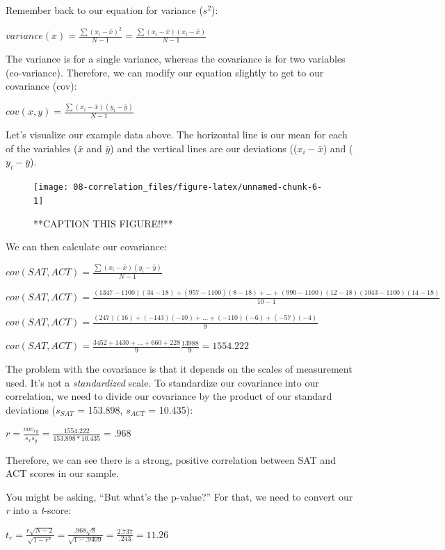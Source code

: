 \documentclass[
]{book}
\begin{document}
Remember back to our equation for variance (\(s^2\)):

\(variance (x) = \frac{\sum(x_i-\bar{x})^2}{N - 1} = \frac{\sum(x_i-\bar{x})(x_i-\bar{x})}{N - 1}\)

The variance is for a single variance, whereas the covariance is for two variables (co-variance). Therefore, we can modify our equation slightly to get to our covariance (cov):

\(cov(x,y) = \frac{\sum(x_i-\bar{x})(y_i-\bar{y})}{N - 1}\)

Let's visualize our example data above. The horizontal line is our mean for each of the variables (\(\bar{x}\) and \(\bar{y}\)) and the vertical lines are our deviations ((\(x_i - \bar{x}\)) and (\(y_i - \bar{y}\)).

\begin{figure}

{\centering \texttt{[image: 08-correlation\_files/figure-latex/unnamed-chunk-6-1]} 

}

\caption{**CAPTION THIS FIGURE!!**}\label{fig:unnamed-chunk-6}
\end{figure}

We can then calculate our covariance:

\(cov(SAT,ACT) = \frac{\sum(x_i-\bar{x})(y_i-\bar{y})}{N - 1}\)

\(cov(SAT,ACT) = \frac{(1347-1100)(34-18) + (957-1100)(8-18) + \ldots + (990-1100)(12-18)(1043-1100)(14-18)}{10 - 1}\)

\(cov(SAT,ACT) = \frac{(247)(16) + (-143)(-10) + \ldots + (-110)(-6) + (-57)(-4)}{9}\)

\(cov(SAT,ACT) = \frac{3452 + 1430 + \ldots + 660 + 228}{9} \frac{13988}{9} = 1554.222\)

The problem with the covariance is that it depends on the scales of measurement used. It's not a \emph{standardized} scale. To standardize our covariance into our correlation, we need to divide our covariance by the product of our standard deviations (\(s_{SAT}\) = 153.898, \(s_{ACT}\) = 10.435):

\(r = \frac{cov_{xy}}{s_x s_y} = \frac{1554.222}{153.898 *10.435} = .968\)

Therefore, we can see there is a strong, positive correlation between SAT and ACT scores in our sample.

You might be asking, ``But what's the p-value?'' For that, we need to convert our \emph{r} into a \emph{t}-score:

\(t_r = \frac{r \sqrt{N-2}}{\sqrt{1-r^2}} = \frac{.968 \sqrt{8}}{\sqrt{1-.9409}} = \frac{2.737}{.243} = 11.26\)
\end{document}
